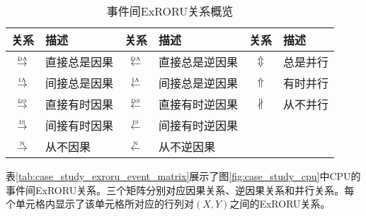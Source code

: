 \begin{table}[htbp]
  \centering
	\caption{事件间ExRORU关系概览}
	\label{tab:exroru_event}
	\begin{tabular}{clclcl}
	  \toprule[1.5pt]
	  关系 & 描述 & 关系 & 描述 & 关系 & 描述 \\\midrule[1pt]
	  $\overset{\text{\tiny{DA}}}{\rightarrow}$ & 直接总是因果 & $\overset{\text{\tiny{DA}}}{\leftarrow}$ & 直接总是逆因果 & $\Updownarrow$ & 总是并行\\
	  $\overset{\text{\tiny{IA}}}{\rightarrow}$ & 间接总是因果 & $\overset{\text{\tiny{IA}}}{\leftarrow}$ & 间接总是逆因果 & $\Uparrow$ & 有时并行\\
	  $\overset{\text{\tiny{DS}}}{\rightarrow}$ & 直接有时因果 & $\overset{\text{\tiny{DS}}}{\leftarrow}$ & 直接有时逆因果 & $\nparallel$ & 从不并行\\
	  $\overset{\text{\tiny{IS}}}{\rightarrow}$ & 间接有时因果 & $\overset{\text{\tiny{IS}}}{\leftarrow}$ & 间接有时逆因果 & & \\
	  $\overset{\text{\tiny{N}}}{\rightarrow}$ & 从不因果 & $\overset{\text{\tiny{N}}}{\leftarrow}$ & 从不逆因果 & & \\
	  \bottomrule[1.5pt]
	\end{tabular}
\end{table}

\begin{example}\label{ex:case_study_exroru_event_matrix}
表\ref{tab:case_study_exroru_event_matrix}展示了图\ref{fig:case_study_cpu}中CPU的事件间ExRORU关系。三个矩阵分别对应因果关系、逆因果关系和并行关系。每个单元格内显示了该单元格所对应的行列对$(X,Y)$之间的ExRORU关系。
\end{example}

